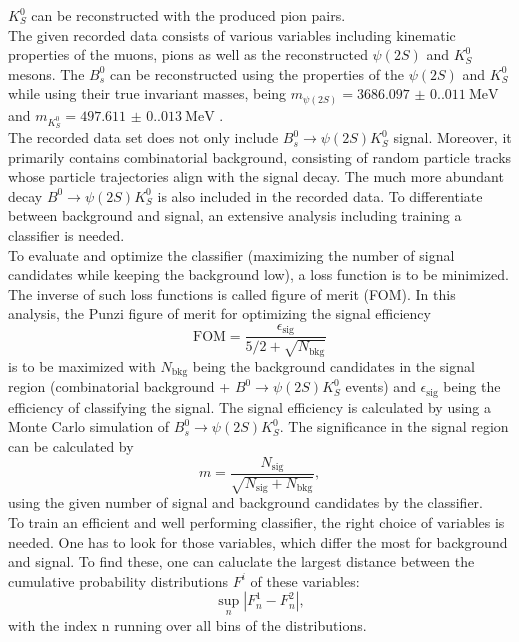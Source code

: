 $K_S^0$ can be reconstructed with the produced pion pairs.\\
The given recorded data consists of various variables including kinematic properties of the muons, pions as well as the reconstructed $\psi (2S)$ and $K_S^0$ mesons. The $B_s^0$ can be reconstructed using the
properties of the $\psi (2S)$ and $K_S^0$ while using their true invariant masses, being $m_{\psi (2S)} = \qty{3686.097(0.011)}{\mega\electronvolt}$ and $m_{K_S^0} = \qty{497.611(0.013)}{\mega\electronvolt}$ \cite{PDG}.\\
The recorded data set does not only include $B_s^0 \to \psi (2S)K_S^0$ signal. Moreover, it primarily contains combinatorial background, consisting of random particle tracks whose particle trajectories align with the
signal decay. The much more abundant decay $B^0 \to \psi (2S)K_S^0$ is also included in the recorded data. To differentiate between background and signal, an extensive analysis including
training a classifier is needed.\\
To evaluate and optimize the classifier (maximizing the number of signal candidates while keeping the background low), a loss function is to be minimized. The inverse of such loss functions is called figure of merit (FOM).
In this analysis, the Punzi figure of merit for optimizing the signal efficiency
\begin{equation}
    \label{eq:FOM}
    \mathrm{FOM}  = \frac{\epsilon_{\mathrm{sig}}}{5/2 + \sqrt{N_{\mathrm{bkg}}}}
\end{equation}
is to be maximized with $N_{\mathrm{bkg}}$ being the background candidates in the signal region (combinatorial background + $B^0 \to \psi (2S)K_S^0$ events) and $\epsilon_{\mathrm{sig}}$ being the efficiency of classifying
the signal. The signal efficiency is calculated by using a Monte Carlo simulation of $B_s^0 \to \psi (2S)K_S^0$. The significance in the signal region can be calculated by
\begin{equation}
    \label{eq:sign}
    m = \frac{N_{\mathrm{sig}}}{\sqrt{N_{\mathrm{sig}} + N_{\mathrm{bkg}}}},
\end{equation}
using the given number of signal and background candidates by the classifier.\\
To train an efficient and well performing classifier, the right choice of variables is needed. One has to look for those variables, which differ the most for background and signal. To find these, one can caluclate the 
largest distance between the cumulative probability distributions $F^i$ of these variables:
\begin{equation}
    \label{eq:Kolmogorov}
    \sup\limits_{n} | F_n^1 - F_n^2 |,
\end{equation}
with the index n running over all bins of the distributions. 